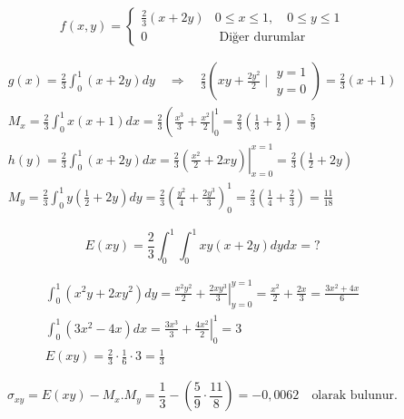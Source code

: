 \documentclass[a4paper,10pt]{article}
\begin{document}
\begin{center}
  $$f(x, y)=\left\{\begin{array}{cc}
\frac{2}{3}(x+2 y) & 0 \leq x \leq 1, \quad 0 \leq y \leq 1 \\
0 & \text { Diğer durumlar }
\end{array}\right.$$
\end{center}

$$\begin{array}{l}
g(x)=\frac{2}{3} \int_{0}^{1}(x+2 y) d y \quad \Rightarrow \quad \frac{2}{3}\left(x y+\frac{2 y^{2}}{2} \mid \begin{array}{l}
y=1 \\
y=0
\end{array}\right)=\frac{2}{3}(x+1) \\
M_{x}=\frac{2}{3} \int_{0}^{1} x(x+1) d x=\frac{2}{3}\left(\frac{x^{3}}{3}+\left.\frac{x^{2}}{2}\right|_{0} ^{1}=\frac{2}{3}\left(\frac{1}{3}+\frac{1}{2}\right)=\frac{5}{9}\right. \\
h(y)=\frac{2}{3} \int_{0}^{1}(x+2 y) d x=\left.\frac{2}{3}\left(\frac{x^{2}}{2}+2 x y\right)\right|_{x=0} ^{x=1} = \frac{2}{3}\left(\frac{1}{2}+2 y\right) \\
M_{y}=\frac{2}{3} \int_{0}^{1} y\left(\frac{1}{2}+2 y\right) d y=\frac{2}{3}\left(\frac{y^{2}}{4}+\frac{2 y^{3}}{3}\right)_{0}^{1}=\frac{2}{3}\left(\frac{1}{4}+\frac{2}{3}\right)=\frac{11}{18}
\end{array}$$

\vspace{0.5cm}

$$E(x y)=\frac{2}{3} \int_{0}^{1} \int_{0}^{1} x y(x+2 y) d y d x=?$$

\vspace{0.5cm}

$$\begin{array}{l}
\int_{0}^{1}\left(x^{2} y+2 x y^{2}\right) d y=\frac{x^{2} y^{2}}{2}+\left.\frac{2 x y^{3}}{3}\right|_{y=0} ^{y=1}=\frac{x^{2}}{2}+\frac{2 x}{3}=\frac{3 x^{2}+4 x}{6} \\
\int_{0}^{1}\left(3 x^{2}-4 x\right) d x=\frac{3 x^{3}}{3}+\left.\frac{4 x^{2}}{2}\right|_{0} ^{1}=3 \\
E(x y)=\frac{2}{3} \cdot \frac{1}{6} \cdot 3=\frac{1}{3}
\end{array}$$

\vspace{0.3cm}

$$\sigma_{x y}=E(x y)-M_{x}.M_{y}=\frac{1}{3}-\left(\frac{5}{9} \cdot \frac{11}{8}\right)=-0,0062 \quad \text{olarak bulunur.}$$
\end{document}
